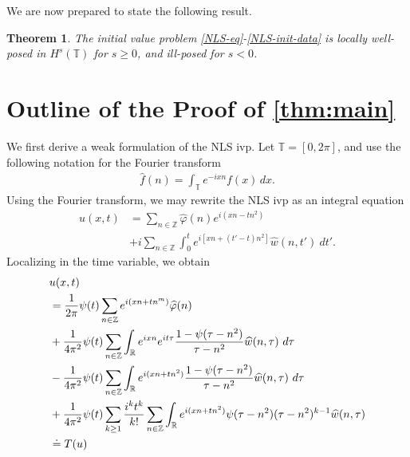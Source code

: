 \documentclass[12pt,reqno]{amsart}
\numberwithin{equation}{section}  %
\numberwithin{figure}{section}
\newcommand{\rr}{\mathbb{R}}
\newcommand{\zz}{\mathbb{Z}}
\newcommand{\ci}{\mathbb{T}}
\newcommand{\wh}{\widehat}
\newcommand{\vp}{\varphi}
\theoremstyle{plain}
\newtheorem{theorem}{Theorem}
\theoremstyle{definition}
\theoremstyle{remark}
\begin{document}
%
%
We are now prepared to state the following result.
%
%
%
%
%
%
%
%
%
%
\begin{theorem}
\label{thm:main}
The initial value problem 
\eqref{NLS-eq}-\eqref{NLS-init-data} is locally well-posed in $H^s(\ci)$ for $s \ge
0$, and ill-posed for $s <0$. %
%
\end{theorem} 
%
%
%
%
%
%
%
%
%
%
\section{Outline of the Proof of \autoref{thm:main}}
%
%
%
%
%
We first derive a weak formulation of the NLS ivp. 
Let $\ci = [0, 2 \pi]$, and use
the following notation for the Fourier transform
%
%
%
%
\begin{equation}
	\label{four-trans-pde}
	\begin{split}
		\widehat{f}(n) = \int_{\ci} e^{-ix n} f(x) \, dx.
	\end{split}
\end{equation}
Using the Fourier transform, we may rewrite the NLS ivp as an integral
equation 
%
%
\begin{equation}
	\label{NLS-integral-form}
	\begin{split}
		u(x,t) & = \sum_{n \in \zz} \wh{\vp}(n) e^{i\left( xn - t n^2 
		\right)} 
		\\
		& + i \sum_{n \in \zz} \int_0^t e^{i\left[ xn + \left( t' - t 
		\right) n^2 \right]} \wh{w}(n, t') \ dt'.
	\end{split}
\end{equation}
%
%
Localizing in the time variable, we obtain
%
%
\begin{align}
	\label{main-int-expression-0}
	& u(x, t) 
		\\
		\label{main-int-expression-1}
		& = \frac{1}{2 \pi} \psi(t) \sum_{n \in \zz} e^{i(xn + tn^{m 
		})} \widehat{\vp}(n) 
		\\
		\label{main-int-expression-2}
		& + \frac{1}{4 \pi^2} \psi(t) \sum_{n\in \zz} \int_\rr e^{ixn}  
		e^{it \tau} \frac{ 1 - \psi(\tau -  n^2) 
		}{\tau -  n^2} \wh{w}(n, \tau) \ d \tau
		\\
		\label{main-int-expression-3}
		& - \frac{1}{4 \pi^2} \psi(t) \sum_{n\in \zz} \int_\rr e^{i(xn + 
		t n^2)}
		 \frac{1- \psi(\tau -  n^2)}{\tau -  n^2} \wh{w}(n, \tau) \ d \tau
		\\
		\label{main-int-expression-4}
		& + \frac{1}{4 \pi^2} \psi(t) \sum_{k \ge 1} \frac{i^k t^k}{k!}
		\sum_{n \in \zz} \int_\rr e^{i(xn + t n^2 )}
		\psi(\tau -  n^2) (\tau -  n^2)^{k-1} \wh{w}(n, \tau)  
		\\
		& \doteq T(u) \notag
\end{align}
\end{document}

